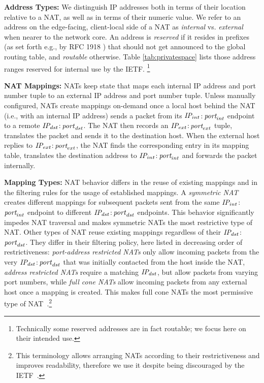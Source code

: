 \documentclass[10pt]{sig-alternate-05-2015}
\newcommand{\parax}[1]{\vspace{0.2em} \noindent \textbf{#1:}}
\providecommand{\ie}{{i.e.}, }
\newcommand{\privateipport}{$\text{\it IP}_{int}$$:$$\text{\it 
port}_{int}$\xspace}
\newcommand{\publicipport}{$\text{\it IP}_{ext}$$:$$\text{\it 
port}_{ext}$\xspace}
\newcommand{\dstipport}{$\text{\it IP}_{dst}$$:$${\it port}_{dst}$\xspace}
\newcommand{\dstip}{$\text{\it IP}_{dst}$\xspace}
\begin{document}
\parax{Address Types}
We distinguish IP addresses both in terms of their location relative
to a NAT, as well as in terms of their numeric value.  We refer to an
address on the edge-facing, client-local side of a NAT as {\it
  internal} vs. {\it external} when nearer to the network core.  An
address is {\it reserved} if it resides in prefixes (as set forth
e.g., by RFC 1918 \cite{rfc1918}) that should not get announced to the global 
routing table, and {\it routable} otherwise. Table \ref{tab:privatespace} lists 
those address ranges reserved for internal use by the IETF. 
\footnote{Technically some reserved addresses are in fact routable; we
  focus here on their intended use.}

\parax{NAT Mappings}
NATs keep state that maps each internal IP address and
port number tuple to an external IP address and port
number tuple.  Unless manually configured, NATs create mappings
on-demand once a local host behind the NAT (\ie with an internal IP
address) sends a packet from its \privateipport endpoint to a
remote \dstipport. The NAT then records an \publicipport tuple,
translates the packet and sends it to the destination host. When the
external host replies to \publicipport, the NAT finds the
corresponding entry in its mapping table, translates the destination
address to \privateipport and forwards the packet internally.



\parax{Mapping Types}
NAT behavior differs in the reuse of existing mappings and in the 
filtering rules for the usage of established mappings. A 
\textit{symmetric NAT} creates different mappings for subsequent packets 
sent from the same \privateipport endpoint to different \dstipport 
endpoints. This behavior significantly impedes NAT traversal and makes 
symmetric NATs the most restrictive type of NAT. Other types of NAT 
reuse existing mappings regardless of their \dstipport. They differ 
in their filtering policy, here listed in decreasing order of restrictiveness: 
\textit{port-address restricted NATs} only allow incoming packets from the very 
\dstipport that was initially contacted from the host inside the NAT, 
\textit{address restricted NATs} require a matching \dstip, 
but allow packets from varying port numbers, while 
\textit{full cone NATs} allow incoming packets from any external host once a 
mapping is created. This makes full cone NATs the most permissive type of 
NAT~\cite{rfc3489}.\footnote{This terminology allows arranging NATs 
according to their restrictiveness and improves readability, therefore 
we use it despite being discouraged by the IETF~\cite{rfc4787}.}
\end{document}
